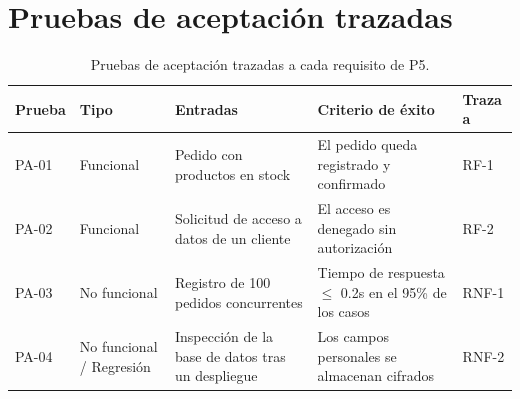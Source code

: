 \documentclass[11pt,a4paper]{article}
\begin{document}
\FloatBarrier

\section{Pruebas de aceptación trazadas}

\begin{table}[H]
\centering
\small
\begin{tabular}{l l L{3.2cm} L{3.2cm} l}
\toprule
\textbf{Prueba} & \textbf{Tipo} & \textbf{Entradas} & \textbf{Criterio de éxito} & \textbf{Traza a} \\
\midrule
PA-01 & Funcional      & Pedido con productos en stock              & El pedido queda registrado y confirmado & RF-1 \\
PA-02 & Funcional      & Solicitud de acceso a datos de un cliente  & El acceso es denegado sin autorización  & RF-2 \\
PA-03 & No funcional   & Registro de 100 pedidos concurrentes       & Tiempo de respuesta $\leq$ 0.2s en el 95\% de los casos & RNF-1 \\
PA-04 & No funcional / Regresión & Inspección de la base de datos tras un despliegue & Los campos personales se almacenan cifrados & RNF-2 \\
\bottomrule
\end{tabular}
\caption{Pruebas de aceptación trazadas a cada requisito de P5.}
\end{table}

\FloatBarrier
\end{document}

